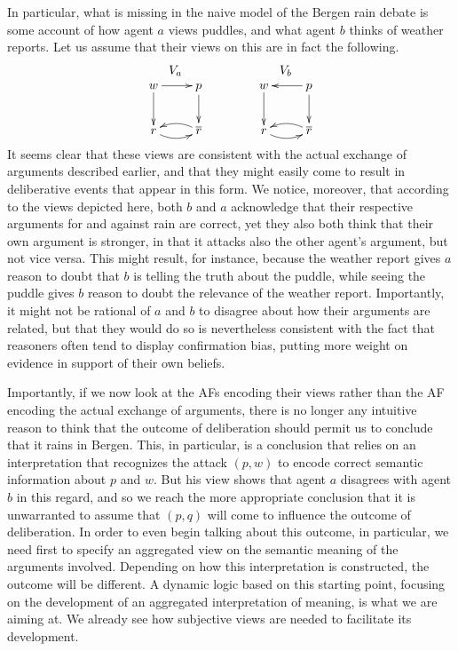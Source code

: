 \documentclass[greybox]{svmult}
\renewcommand{\bar}[1]{\overline{#1}}
\begin{document}
In particular, what is missing in the naive model of the Bergen rain debate is some account of how agent $a$ views puddles, and what agent $b$ thinks of weather reports. Let us assume that their views on this are in fact the following.
\begin{equation}\label{rainview}
\begin{array}{cc}
V_{a} \hspace{3em} & V_{b} \\
\xymatrix{ w \ar[d] \ar[r] & p \ar[d] \\ r \ar@/_/[r] & \bar r \ar@/_/[l] } \hspace{3em} &
\xymatrix{w \ar[d] & p \ar[d] \ar[l] \\ r \ar@/_/[r] & \bar r \ar@/_/[l] }
\end{array}
\end{equation}
It seems clear that these views are consistent with the actual exchange of arguments described earlier, and that they might easily come to result in deliberative events that appear in this form. We notice, moreover, that according to the views depicted here, both $b$ and $a$ acknowledge that their respective arguments for and against rain are correct, yet they also both think that their own argument is stronger, in that it attacks also the other agent's argument, but not vice versa. This might result, for instance, because the weather report gives $a$ reason to doubt that $b$ is telling the truth about the puddle, while seeing the puddle gives $b$ reason to doubt the relevance of the weather report. Importantly, it might not be rational of $a$ and $b$ to disagree about how their arguments are related, but that they would do so is nevertheless consistent with the fact that reasoners often tend to display confirmation bias, putting more weight on evidence in support of their own beliefs.

Importantly, if we now look at the AFs encoding their views rather than the AF encoding the actual exchange of arguments, there is no longer any intuitive reason to think that the outcome of deliberation should permit us to conclude that it rains in Bergen. This, in particular, is a conclusion that relies on an interpretation that recognizes the attack $(p,w)$ to encode correct semantic information about $p$ and $w$. But his view shows that agent $a$ disagrees with agent $b$ in this regard, and so we reach the more appropriate conclusion that it is unwarranted to assume that $(p,q)$ will come to influence the outcome of deliberation. In order to even begin talking about this outcome, in particular, we need first to specify an aggregated view on the semantic meaning of the arguments involved. Depending on how this interpretation is constructed, the outcome will be different. A dynamic logic based on this starting point, focusing on the development of an aggregated interpretation of meaning, is what we are aiming at. We already see how subjective views are needed to facilitate its development.
\end{document}
